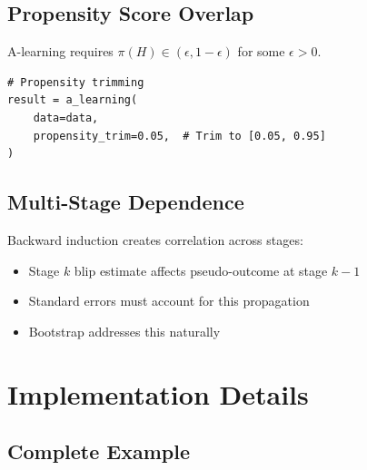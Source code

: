 \subsection{Propensity Score Overlap}

A-learning requires $\pi(H) \in (\epsilon, 1-\epsilon)$ for some $\epsilon > 0$.

\begin{verbatim}
# Propensity trimming
result = a_learning(
    data=data,
    propensity_trim=0.05,  # Trim to [0.05, 0.95]
)
\end{verbatim}

\subsection{Multi-Stage Dependence}

Backward induction creates correlation across stages:
\begin{itemize}
\item Stage $k$ blip estimate affects pseudo-outcome at stage $k-1$
\item Standard errors must account for this propagation
\item Bootstrap addresses this naturally
\end{itemize}


\section{Implementation Details}

\subsection{Complete Example}

